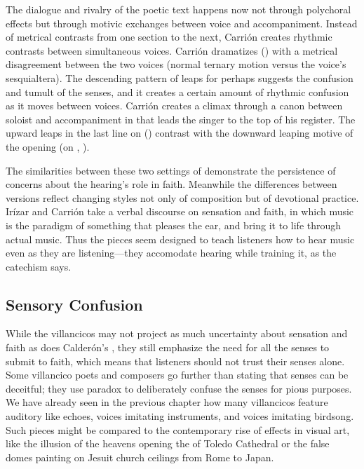 
The dialogue and rivalry of the poetic text happens now not through polychoral effects but through motivic exchanges between voice and accompaniment.
Instead of metrical contrasts from one section to the next, Carrión creates rhythmic contrasts between simultaneous voices.
Carrión dramatizes  () with a metrical disagreement between the two voices (normal ternary motion versus the voice's sesquialtera).
The descending pattern of leaps for  perhaps suggests the confusion and tumult of the senses, and it creates a certain amount of rhythmic confusion as it moves between voices.
Carrión creates a climax through a canon between soloist and accompaniment in  that leads the singer to the top of his register.
The upward leaps in the last line on  () contrast with the downward leaping motive of the opening (on , ).

The similarities between these two settings of  demonstrate the persistence of concerns about the hearing's role in faith.
Meanwhile the differences between versions reflect changing styles not only of composition but of devotional practice.
Irízar and Carrión take a verbal discourse on sensation and faith, in which music is the paradigm of something that pleases the ear, and bring it to life through actual music.
Thus the pieces seem designed to teach listeners how to hear music even as they are listening---they accomodate hearing while training it, as the catechism says.


\subsection{Sensory Confusion}

While the  villancicos may not project as much uncertainty about sensation and faith as does Calderón's , they still emphasize the need for all the senses to submit to faith, which means that listeners should not trust their senses alone.
Some villancico poets and composers go further than stating that senses can be deceitful; they use paradox to deliberately confuse the senses for pious purposes.
We have already seen in the previous chapter how many villancicos feature auditory  like echoes, voices imitating instruments, and voices imitating birdsong.
Such pieces might be compared to the contemporary rise of  effects in visual art, like the illusion of the heavens opening the  of Toledo Cathedral or the false domes painting on Jesuit church ceilings from Rome to Japan.%
    \Autocite[\XXX + illusion in Baroque art]{Bailey:Art}

